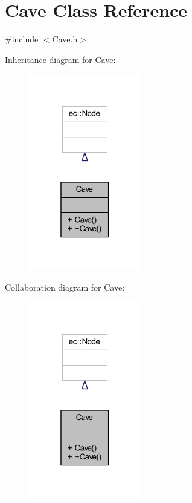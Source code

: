 \hypertarget{class_cave}{}\section{Cave Class Reference}
\label{class_cave}


{\ttfamily \#include $<$Cave.\+h$>$}



Inheritance diagram for Cave\+:\nopagebreak
\begin{figure}[H]
\begin{center}
\leavevmode
\includegraphics[width=139pt]{class_cave__inherit__graph}
\end{center}
\end{figure}


Collaboration diagram for Cave\+:\nopagebreak
\begin{figure}[H]
\begin{center}
\leavevmode
\includegraphics[width=139pt]{class_cave__coll__graph}
\end{center}
\end{figure}
